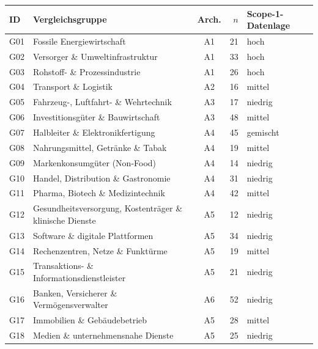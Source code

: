 \begin{tabularx}{\linewidth}{@{}l X c r l@{}}
\toprule
ID & Vergleichsgruppe & Arch. & $n$ & Scope-1-Datenlage \\
\midrule
G01 & Fossile Energiewirtschaft & A1 & 21 & hoch \\
G02 & Versorger \& Umweltinfrastruktur & A1 & 33 & hoch \\
G03 & Rohstoff- \& Prozessindustrie & A1 & 26 & hoch \\
G04 & Transport \& Logistik & A2 & 16 & mittel \\
G05 & Fahrzeug-, Luftfahrt- \& Wehrtechnik & A3 & 17 & niedrig \\
G06 & Investitionsgüter \& Bauwirtschaft & A3 & 48 & mittel \\
G07 & Halbleiter \& Elektronikfertigung & A4 & 45 & gemischt \\
G08 & Nahrungsmittel, Getränke \& Tabak & A4 & 19 & mittel \\
G09 & Markenkonsumgüter (Non-Food) & A4 & 14 & niedrig \\
G10 & Handel, Distribution \& Gastronomie & A4 & 31 & niedrig \\
G11 & Pharma, Biotech \& Medizintechnik & A4 & 42 & mittel \\
G12 & Gesundheitsversorgung, Kostenträger \& klinische Dienste & A5 & 12 & niedrig \\
G13 & Software \& digitale Plattformen & A5 & 34 & niedrig \\
G14 & Rechenzentren, Netze \& Funktürme & A5 & 19 & mittel \\
G15 & Transaktions- \& Informationsdienstleister & A5 & 21 & niedrig \\
G16 & Banken, Versicherer \& Vermögensverwalter & A6 & 52 & niedrig \\
G17 & Immobilien \& Gebäudebetrieb & A5 & 28 & mittel \\
G18 & Medien \& unternehmensnahe Dienste & A5 & 25 & niedrig \\
\bottomrule
\end{tabularx}
